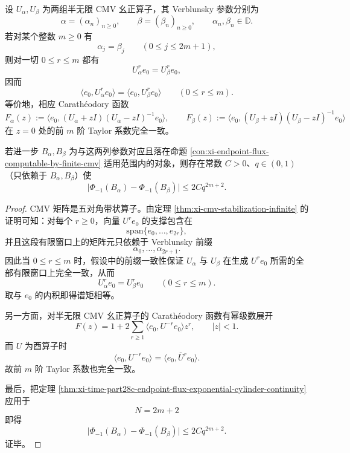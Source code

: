 \begin{theorem}\label{thm:xi-time-part28c-verblunsky-prefix-exact-moment-rigidity}
设 \(U_\alpha,U_\beta\) 为两组半无限 CMV 幺正算子，其 Verblunsky 参数分别为
\[
\alpha=(\alpha_n)_{n\ge 0},
\qquad
\beta=(\beta_n)_{n\ge 0},
\qquad
\alpha_n,\beta_n\in\mathbb D.
\]
若对某个整数 \(m\ge 0\) 有
\[
\alpha_j=\beta_j
\qquad (0\le j\le 2m+1),
\]
则对一切 \(0\le r\le m\) 都有
\[
U_\alpha^r e_0=U_\beta^r e_0,
\]
因而
\[
\boxed{\;
\langle e_0,U_\alpha^r e_0\rangle
=
\langle e_0,U_\beta^r e_0\rangle
\qquad (0\le r\le m).\;}
\]
等价地，相应 Carath\'eodory 函数
\[
F_\alpha(z):=\langle e_0,(U_\alpha+zI)(U_\alpha-zI)^{-1}e_0\rangle,
\qquad
F_\beta(z):=\langle e_0,(U_\beta+zI)(U_\beta-zI)^{-1}e_0\rangle
\]
在 \(z=0\) 处的前 \(m\) 阶 Taylor 系数完全一致。

若进一步 \(B_\alpha,B_\beta\) 为与这两列参数对应且落在命题 \ref{con:xi-endpoint-flux-computable-by-finite-cmv} 适用范围内的对象，则存在常数 \(C>0\)、\(q\in(0,1)\)（只依赖于 \(B_\alpha,B_\beta\)）使
\[
\boxed{\;
\bigl|\Phi_{-1}(B_\alpha)-\Phi_{-1}(B_\beta)\bigr|
\le 2Cq^{2m+2}.\;}
\]
\end{theorem}
\begin{proof}
CMV 矩阵是五对角带状算子。由定理 \ref{thm:xi-cmv-stabilization-infinite} 的证明可知：对每个 \(r\ge 0\)，向量 \(U^r e_0\) 的支撑包含在
\[
\mathrm{span}\{e_0,\dots,e_{2r}\},
\]
并且这段有限窗口上的矩阵元只依赖于 Verblunsky 前缀
\[
\alpha_0,\dots,\alpha_{2r+1}.
\]
因此当 \(0\le r\le m\) 时，假设中的前缀一致性保证 \(U_\alpha\) 与 \(U_\beta\) 在生成 \(U^r e_0\) 所需的全部有限窗口上完全一致，从而
\[
U_\alpha^r e_0=U_\beta^r e_0
\qquad (0\le r\le m).
\]
取与 \(e_0\) 的内积即得谱矩相等。

另一方面，对半无限 CMV 幺正算子的 Carath\'eodory 函数有幂级数展开
\[
F(z)=1+2\sum_{r\ge 1}\langle e_0,U^{-r}e_0\rangle z^r,
\qquad |z|<1.
\]
而 \(U\) 为酉算子时
\[
\langle e_0,U^{-r}e_0\rangle
=
\overline{\langle e_0,U^r e_0\rangle}.
\]
故前 \(m\) 阶 Taylor 系数也完全一致。

最后，把定理 \ref{thm:xi-time-part28c-endpoint-flux-exponential-cylinder-continuity} 应用于
\[
N=2m+2
\]
即得
\[
\bigl|\Phi_{-1}(B_\alpha)-\Phi_{-1}(B_\beta)\bigr|
\le 2Cq^{2m+2}.
\]
证毕。
\end{proof}

